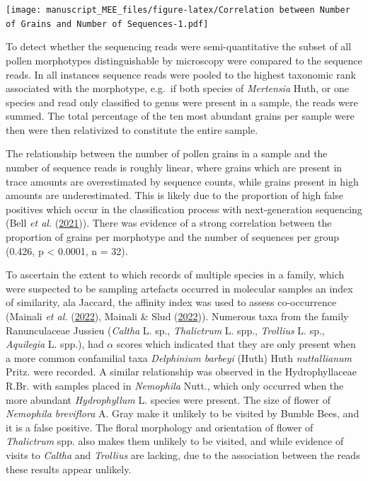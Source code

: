 \documentclass[
]{article}
\begin{document}
\texttt{[image: manuscript\_MEE\_files/figure-latex/Correlation between Number of Grains and Number of Sequences-1.pdf]}

To detect whether the sequencing reads were semi-quantitative the subset
of all pollen morphotypes distinguishable by microscopy were compared to
the sequence reads. In all instances sequence reads were pooled to the
highest taxonomic rank associated with the morphotype, e.g.~if both
species of \emph{Mertensia} Huth, or one species and read only
classified to genus were present in a sample, the reads were summed. The
total percentage of the ten most abundant grains per sample were then
were then relativized to constitute the entire sample.

The relationship between the number of pollen grains in a sample and the
number of sequence reads is roughly linear, where grains which are
present in trace amounts are overestimated by sequence counts, while
grains present in high amounts are underestimated. This is likely due to
the proportion of high false positives which occur in the classification
process with next-generation sequencing (Bell \emph{et al.}
(\protect\hyperlink{ref-bell2021comparing}{2021})). There was evidence
of a strong correlation between the proportion of grains per morphotype
and the number of sequences per group (0.426, p \textless{} 0.0001, n =
32).

To ascertain the extent to which records of multiple species in a
family, which were suspected to be sampling artefacts occurred in
molecular samples an index of similarity, ala Jaccard, the affinity
index was used to assess co-occurrence (Mainali \emph{et al.}
(\protect\hyperlink{ref-mainali2022better}{2022}), Mainali \& Slud
(\protect\hyperlink{ref-mainali2022alpha}{2022})). Numerous taxa from
the family Ranunculaceae Jussieu (\emph{Caltha} L. sp.,
\emph{Thalictrum} L. spp., \emph{Trollius} L. sp., \emph{Aquilegia} L.
spp.), had \(\alpha\) scores which indicated that they are only present
when a more common confamilial taxa \emph{Delphinium barbeyi} (Huth)
Huth \emph{nuttallianum} Pritz. were recorded. A similar relationship
was observed in the Hydrophyllaceae R.Br. with samples placed in
\emph{Nemophila} Nutt., which only occurred when the more abundant
\emph{Hydrophyllum} L. species were present. The size of flower of
\emph{Nemophila breviflora} A. Gray make it unlikely to be visited by
Bumble Bees, and it is a false positive. The floral morphology and
orientation of flower of \emph{Thalictrum} spp. also makes them unlikely
to be visited, and while evidence of visits to \emph{Caltha} and
\emph{Trollius} are lacking, due to the association between the reads
these results appear unlikely.
\end{document}
